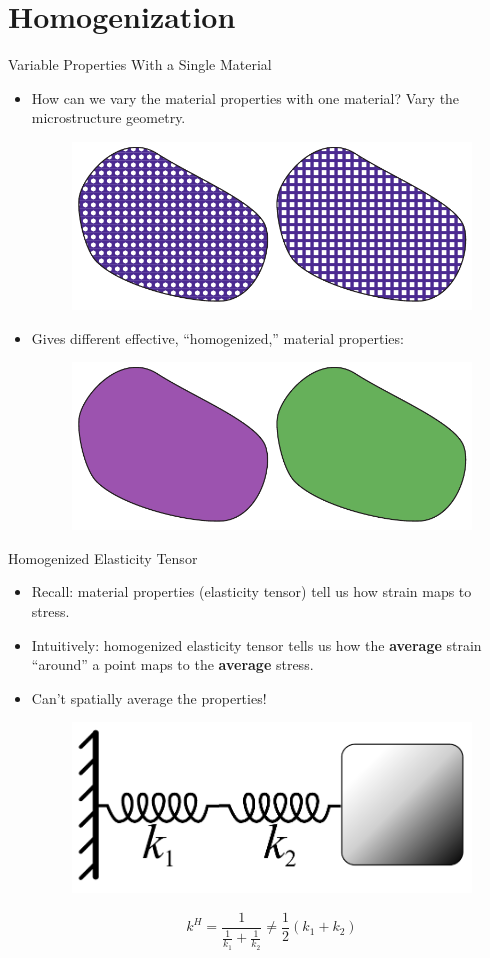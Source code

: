 \section{Homogenization}
\begin{frame}{Variable Properties With a Single Material}
    \begin{itemize}
        \item How can we vary the material properties with one material? Vary the microstructure
              geometry.
        \pause 
        \begin{figure}
            \includegraphics[width=.65\textwidth]{Images/two_patterns.pdf}
        \end{figure}
        \pause \item Gives different effective, ``homogenized,'' material properties:
        \begin{figure}
            \includegraphics[width=.65\textwidth]{Images/two_materials.pdf}
        \end{figure}
    \end{itemize}
\end{frame}

\begin{frame}{Homogenized Elasticity Tensor}
    \begin{itemize}
\item Recall: material properties (elasticity tensor) tell us how strain maps to
    stress.
\item Intuitively: homogenized elasticity tensor tells us how the {\bf average} strain
    ``around'' a point maps to the {\bf average} stress.
\item Can't spatially average the properties!
    \begin{figure}
        \includegraphics[width=.50\textwidth]{Images/SpringsInSeriesWiki.pdf}
    \end{figure}
    $$k^H = \frac{1}{\frac{1}{k_1} + \frac{1}{k_2}} \ne \frac{1}{2}\left(k_1 +
    k_2\right)$$
    \end{itemize}
\end{frame}

